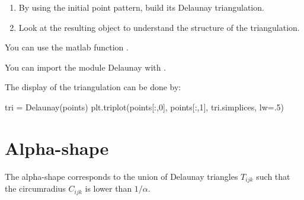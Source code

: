 \begin{qbox}
\begin{enumerate}
	\item By using the initial point pattern, build its Delaunay triangulation.
	\item Look at the resulting object to understand the structure of the triangulation.
\end{enumerate}
\end{qbox}

\begin{mcomment}
\begin{mremark}
You can use the matlab function  .
\end{mremark}
\end{mcomment}

\begin{pcomment}
You can import the module Delaunay with .
 
 The display of the triangulation can be done by:
 \begin{python}
tri = Delaunay(points)
plt.triplot(points[:,0], points[:,1], tri.simplices, lw=.5)
 \end{python}


\end{pcomment}


\section{Alpha-shape}
The alpha-shape corresponds to the union of Delaunay triangles $T_{ijk}$ such that the circumradius $C_{ijk}$ is lower than $1/\alpha$.

